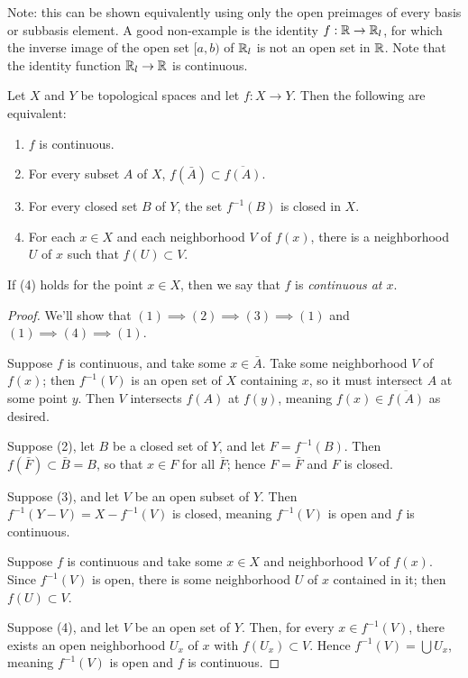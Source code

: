 \documentclass[10pt]{report}
\begin{document}
Note: this can be shown equivalently using only the open preimages of every basis or subbasis element.
A good non-example is the identity $f:\mathbb{R} \rightarrow \mathbb{R}_l$, for which the inverse image of the open set $[a,b)$ of $\mathbb{R}_l$ is not an open set in $\mathbb{R}$.
Note that the identity function $\mathbb{R}_l \rightarrow \mathbb{R}$ is continuous.

\begin{theorem}
  Let $X$ and $Y$ be topological spaces and let $f: X \rightarrow Y$.
  Then the following are equivalent:
  \begin{enumerate}[label={(\arabic*)}]
    \item $f$ is continuous.
    \item For every subset $A$ of $X$, $f(\bar A) \subset \overline{f(A)}$.
    \item For every closed set $B$ of $Y$, the set $f^{-1}(B)$ is closed in $X$.
    \item For each $x \in X$ and each neighborhood $V$ of $f(x)$, there is a neighborhood $U$ of $x$ such that $f(U) \subset V$.
  \end{enumerate}
  If (4) holds for the point $x \in X$, then we say that $f$ is \emph{continuous at $x$}.
\end{theorem}
\begin{proof}
  We'll show that $(1) \implies (2) \implies (3) \implies (1)$ and $(1) \implies (4) \implies (1)$.
  
  Suppose $f$ is continuous, and take some $x \in \bar A$.
  Take some neighborhood $V$ of $f(x)$; then $f^{-1}(V)$ is an open set of $X$ containing $x$, so it must intersect $A$ at some point $y$.
  Then $V$ intersects $f(A)$ at $f(y)$, meaning $f(x) \in \overline{f(A)}$ as desired.

  Suppose (2), let $B$ be a closed set of $Y$, and let $F = f^{-1}(B)$.
  Then $f(\bar{F}) \subset \bar{B} = B$, so that $x \in F$ for all $\bar F$; hence $F = \bar F$ and $F$ is closed.

  Suppose (3), and let $V$ be an open subset of $Y$.
  Then $f^{-1}(Y - V) = X - f^{-1}(V)$ is closed, meaning $f^{-1}(V)$ is open and $f$ is continuous.
 
  Suppose $f$ is continuous and take some $x \in X$ and neighborhood $V$ of $f(x)$.
  Since $f^{-1}(V)$ is open, there is some neighborhood $U$ of $x$ contained in it; then $f(U) \subset V$.

  Suppose (4), and let $V$ be an open set of $Y$.
  Then, for every $x \in f^{-1}(V)$, there exists an open neighborhood $U_x$ of $x$ with $f(U_x) \subset V$.
  Hence $f^{-1}(V) = \bigcup U_x$, meaning $f^{-1}(V)$ is open and $f$ is continuous.
\end{proof}
\end{document}
